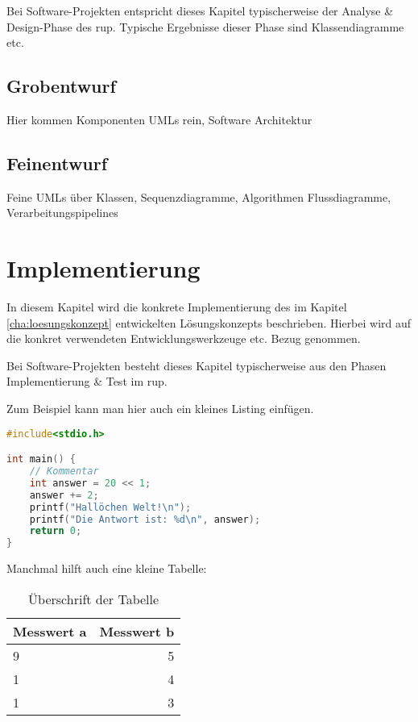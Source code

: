 \documentclass[oneside]{ausarbeitung}
\begin{document}
Bei Software-Projekten entspricht dieses Kapitel typischerweise der 
Analyse \& Design-Phase des \ac{rup}. Typische Ergebnisse dieser Phase sind 
Klassendiagramme etc.
\section{Grobentwurf}
Hier kommen Komponenten UMLs rein, Software Architektur
\section{Feinentwurf}
Feine UMLs über Klassen, Sequenzdiagramme, Algorithmen Flussdiagramme, Verarbeitungspipelines

\chapter{Implementierung}
\label{cha:implementierung}

In diesem Kapitel wird die konkrete Implementierung des im Kapitel
\ref{cha:loesungskonzept} entwickelten Lösungskonzepts beschrieben.
Hierbei wird auf die konkret verwendeten Entwicklungswerkzeuge etc. 
Bezug genommen.

Bei Software-Projekten besteht dieses Kapitel typischerweise aus den 
Phasen Implementierung \& Test im \ac{rup}.

Zum Beispiel kann man hier auch ein kleines Listing einfügen.

\begin{lstlisting}[language=c,%
                   caption={Überschrift des Quelltexts}]
#include<stdio.h>

int main() {
    // Kommentar
    int answer = 20 << 1;
    answer += 2;
    printf("Hallöchen Welt!\n");
    printf("Die Antwort ist: %d\n", answer);
    return 0;
}
\end{lstlisting}

Manchmal hilft auch eine kleine Tabelle:

\begin{table}[htbp]
\centering
\begin{tabular}{|l|r|}
\hline
\textbf{Messwert a} & \textbf{Messwert b} \\ \hline
9 & 5 \\ \hline
1 & 4 \\ \hline
1 & 3 \\ \hline
\end{tabular}
\caption{Überschrift der Tabelle}
\label{tab:my-table}
\end{table}
\end{document}
